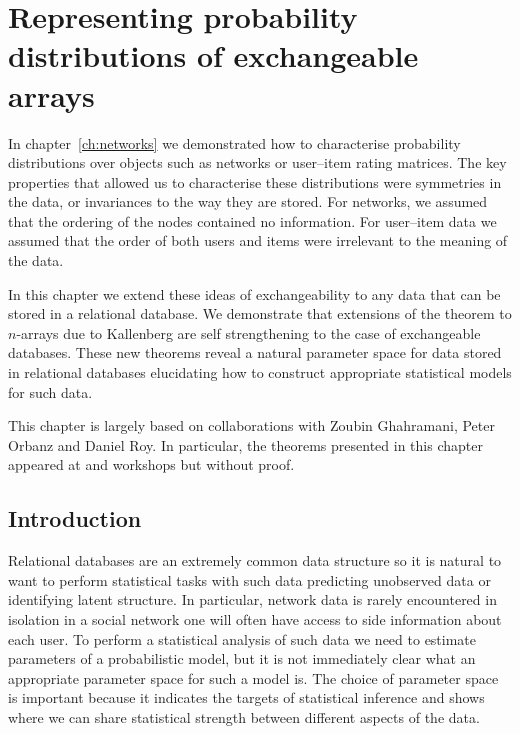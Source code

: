 
\inbpdocument

\chapter{Representing probability distributions of exchangeable arrays}
\label{ch:arrays}

In chapter~\ref{ch:networks} we demonstrated how to characterise probability distributions over objects such as networks or user--item rating matrices.
The key properties that allowed us to characterise these distributions were symmetries in the data, or invariances to the way they are stored.
For networks, we assumed that the ordering of the nodes contained no information.
For user--item data we assumed that the order of both users and items were irrelevant to the meaning of the data.

In this chapter we extend these ideas of exchangeability to any data that can be stored in a relational database.
We demonstrate that extensions of the  theorem to $n$-arrays due to Kallenberg  are self strengthening to the case of exchangeable databases.
These new theorems reveal a natural parameter space for data stored in relational databases elucidating how to construct appropriate statistical models for such data.

This chapter is largely based on collaborations with Zoubin Ghahramani, Peter Orbanz and Daniel Roy.
In particular, the theorems presented in this chapter appeared at  and  workshops but without proof.

\section{Introduction}

Relational databases are an extremely common data structure so it is natural to want to perform statistical tasks with such data \eg predicting unobserved data or identifying latent structure.
In particular, network data is rarely encountered in isolation \eg in a social network one will often have access to side information about each user.
To perform a statistical analysis of such data we need to estimate parameters of a probabilistic model, but it is not immediately clear what an appropriate parameter space for such a model is.
The choice of parameter space is important because it indicates the targets of statistical inference and shows where we can share statistical strength between different aspects of the data.

